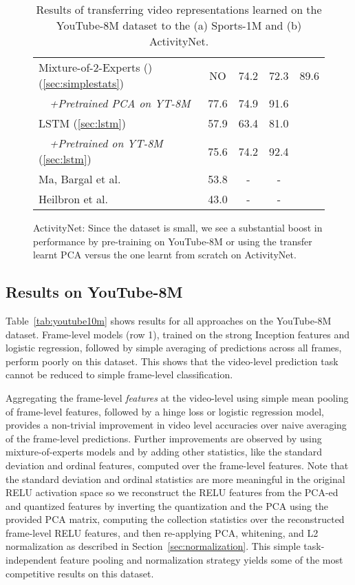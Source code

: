 \documentclass{sig-alternate-05-2015}
\begin{document}
\begin{table*}
\begin{subfigure}[ht]{0.48\linewidth}
{\begin{tabular}{|l|c|c|c|c|}
  Mixture-of-2-Experts () (\ref{sec:simplestats}) &  NO & 74.2 & 72.3 & 89.6 \\
  \ \ {\it +Pretrained PCA on YT-8M }                           &  77.6 & 74.9  & 91.6 \\
  LSTM (\ref{sec:lstm})                                         &  57.9 & 63.4  & 81.0 \\
  \ \ {\it +Pretrained on YT-8M } (\ref{sec:lstm})              &  75.6 & 74.2  & 92.4 \\
  \hline \hline
  Ma, Bargal et al.\cite{activitynetsarah}                      &   53.8 &  -    &  -   \\
  Heilbron et al.\cite{actnet}                                  &   43.0 &  -    &  -   \\
\hline
\end{tabular}}
\caption{ActivityNet: Since the dataset is small, we see a substantial boost in
performance by pre-training on YouTube-8M or using the transfer learnt PCA
versus the one learnt from scratch on ActivityNet.}
\label{tab:actnet}
\end{subfigure}
\caption{\small Results of transferring video representations learned on the YouTube-8M dataset to the (a) Sports-1M and (b) ActivityNet. }
\end{table*}


\subsection{Results on YouTube-8M}

Table~\ref{tab:youtube10m} shows results for all approaches on the YouTube-8M
dataset. Frame-level models (row 1), trained on the strong Inception features
and logistic regression, followed by simple averaging of predictions across all
frames, perform poorly on this dataset. This shows that the video-level
prediction task cannot be reduced to simple frame-level classification.

Aggregating the frame-level \emph{features} at the video-level using simple mean
pooling of frame-level features, followed by a hinge loss or logistic regression
model, provides a non-trivial improvement in video level accuracies over naive
averaging of the frame-level predictions. Further improvements are observed by
using mixture-of-experts models and by adding other statistics, like the
standard deviation and ordinal features, computed over the frame-level features.
Note that the standard deviation and ordinal statistics are more meaningful in
the original RELU activation space so we reconstruct the RELU features from the
PCA-ed and quantized features by inverting the quantization and the PCA using
the provided PCA matrix, computing the collection statistics over the reconstructed
frame-level RELU features, and then re-applying PCA, whitening, and L2
normalization as described in Section~\ref{sec:normalization}. This simple
task-independent feature pooling and normalization strategy yields some of the
most competitive results on this dataset.
\end{document}
